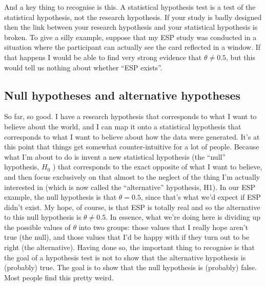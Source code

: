\documentclass[
  a4paper,
]{book}
\begin{document}
And a key thing to recognise is this. A statistical hypothesis test is a
test of the statistical hypothesis, not the research hypothesis. If your
study is badly designed then the link between your research hypothesis
and your statistical hypothesis is broken. To give a silly example,
suppose that my ESP study was conducted in a situation where the
participant can actually see the card reflected in a window. If that
happens I would be able to find very strong evidence that
\(\theta \neq 0.5\), but this would tell us nothing about whether ``ESP
exists''.

\hypertarget{null-hypotheses-and-alternative-hypotheses}{%
\subsection{Null hypotheses and alternative
hypotheses}\label{null-hypotheses-and-alternative-hypotheses}}

So far, so good. I have a research hypothesis that corresponds to what I
want to believe about the world, and I can map it onto a statistical
hypothesis that corresponds to what I want to believe about how the data
were generated. It's at this point that things get somewhat
counter-intuitive for a lot of people. Because what I'm about to do is
invent a new statistical hypothesis (the ``null'' hypothesis, \(H_0\) )
that corresponds to the exact opposite of what I want to believe, and
then focus exclusively on that almost to the neglect of the thing I'm
actually interested in (which is now called the ``alternative''
hypothesis, H1). In our ESP example, the null hypothesis is that
\(\theta = 0.5\), since that's what we'd expect if ESP didn't exist. My
hope, of course, is that ESP is totally real and so the alternative to
this null hypothesis is \(\theta \neq 0.5\). In essence, what we're
doing here is dividing up the possible values of \(\theta\) into two
groups: those values that I really hope aren't true (the null), and
those values that I'd be happy with if they turn out to be right (the
alternative). Having done so, the important thing to recognise is that
the goal of a hypothesis test is not to show that the alternative
hypothesis is (probably) true. The goal is to show that the null
hypothesis is (probably) false. Most people find this pretty weird.
\end{document}
